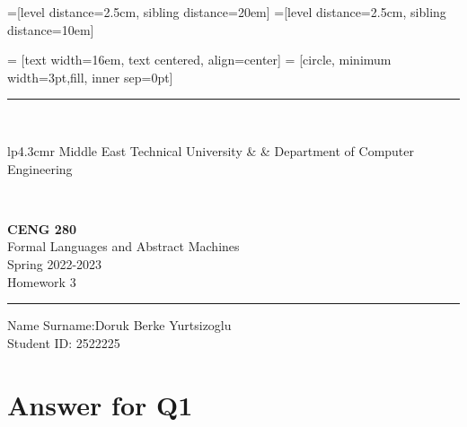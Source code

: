 \documentclass[12pt]{article}
\newcommand{\HRule}{\rule{\linewidth}{1mm}}
\begin{document}
=[level distance=2.5cm, sibling distance=20em]
=[level distance=2.5cm, sibling distance=10em]

 = [text width=16em, text centered, align=center]
 = [circle, minimum width=3pt,fill, inner sep=0pt]

\noindent
\HRule \\[3mm]
\small
\begin{tabular}[b]{lp{4.3cm}r}
Middle East Technical University &  &
Department of Computer Engineering \\
\end{tabular} \\
\begin{center}

                 \LARGE \textbf{CENG 280} \\[4mm]
                 \Large Formal Languages and Abstract Machines \\[4mm]
                \normalsize Spring 2022-2023 \\
                    \Large Homework 3 \\
\end{center}
\HRule



\begin{center}
Name Surname:Doruk Berke Yurtsizoglu   \\
Student ID: 2522225
\end{center}



\section*{Answer for Q1}
\end{document}
